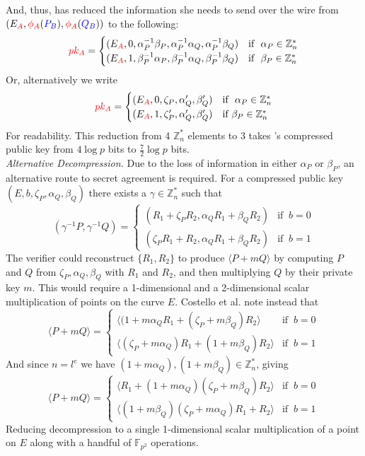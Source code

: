 And, thus, \alice has reduced the information she needs to send over the wire from $(E_{\textcolor{red}{A}}, \textcolor{red}{\phi_A}(\textcolor{blue}{P_B}), \textcolor{red}{\phi_A}(\textcolor{blue}{Q_B}))$ to the following:
$$
\textcolor{red}{pk_A} = \begin{cases}
	   (E_{\textcolor{red}{A}}, 0, \alpha^{-1}_{P}\beta_{P}, \alpha^{-1}_{P}\alpha_{Q}, \alpha^{-1}_{P}\beta_{Q}) & \text{if }\ \alpha_{P} \in \mathbb{Z}^{*}_{n}\\
	   (E_{\textcolor{red}{A}}, 1, \beta^{-1}_{P}\alpha_{P}, \beta^{-1}_{P}\alpha_{Q}, \beta^{-1}_{P}\beta_{Q}) & \text{if }\ \beta_{P} \in \mathbb{Z}^{*}_{n}
	   \end{cases}
$$
Or, alternatively we write
$$
\textcolor{red}{pk_A} = \begin{cases}
	   (E_{\textcolor{red}{A}}, 0, \zeta_{P}, \alpha'_{Q}, \beta'_{Q}) & \text{if }\ \alpha_{P} \in \mathbb{Z}^{*}_{n}\\
	   (E_{\textcolor{red}{A}}, 1, \zeta'_{P}, \alpha'_{Q}, \beta'_{Q}) & \text{if}\ \beta_{P} \in \mathbb{Z}^{*}_{n}
	   \end{cases}
$$
For readability. This reduction from 4 $\mathbb{Z}^{*}_{n}$ elements to 3 takes \alice's compressed public key from $4\log p$ bits to $\frac{7}{2}\log p$ bits.\\

\noindent
\textit{Alternative Decompression.} Due to the loss of information in either $\alpha_{P}$ or $\beta_{P}$, an alternative route to secret agreement is required. For a compressed public key $(E, b, \zeta_{P}, \alpha_{Q}, \beta_{Q})$ there exists a $\gamma \in \mathbb{Z}^{*}_{n}$ such that
$$
(\gamma^{-1}P, \gamma^{-1}Q) = 
\begin{cases}
(R_1 + \zeta_{P}R_2, \alpha_{Q}R_1 + \beta_{Q}R_2) & \text{if }\ b = 0\\
(\zeta_{P}R_1 + R_2, \alpha_{Q}R_1 + \beta_{Q}R_2) & \text{if }\ b = 1
\end{cases}
$$
The verifier could reconstruct $\{R_1, R_2\}$ to produce $\langle P + mQ \rangle$ by computing $P$ and $Q$ from $\zeta_{P}, \alpha_{Q}, \beta_{Q}$ with $R_1$ and $R_2$, and then multiplying $Q$ by their private key $m$. This would require a 1-dimensional and a 2-dimensional scalar multiplication of points on the curve $E$. Costello et al. note instead that 
$$
\langle P + mQ \rangle = 
\begin{cases}
\langle (1 + m\alpha_{Q} R_1 + (\zeta_{P} + m\beta_{Q})R_2 \rangle & \text{if }\ b = 0\\
\langle (\zeta_{P} + m\alpha_{Q})R_1 + (1 + m\beta_{Q})R_2 \rangle & \text{if }\ b = 1
\end{cases}
$$
And since $n=l^{e}$ we have $(1 + m\alpha_{Q}), (1 + m\beta_{Q}) \in \mathbb{Z}^{*}_{n}$, giving
$$
\langle P + mQ \rangle = 
\begin{cases}
\langle R_1 + (1 + m\alpha_{Q})(\zeta_{P} + m\beta_{Q})R_2 \rangle & \text{if }\ b = 0\\
\langle (1 + m\beta_{Q})(\zeta_{P} + m\alpha_{Q})R_1 + R_2 \rangle & \text{if }\ b = 1
\end{cases}
$$
Reducing decompression to a single 1-dimensional scalar multiplication of a point on $E$ along with a handful of $\mathbb{F}_{p^{2}}$ operations.


